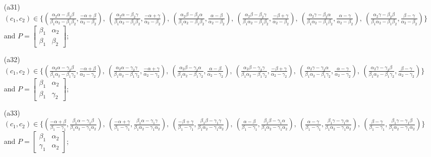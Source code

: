 \begin{enumerate}
\item[(a31)] $(c_1,c_2)\in \{(\frac{\alpha_2 \alpha  - \beta_2 \beta }{\beta_1 \alpha_2 - \beta_1 \beta_2},\frac{-\alpha  + \beta }{\alpha_2 - \beta_2}),\allowbreak\ (\frac{\alpha_2 \alpha  - \beta_2 \gamma }{\beta_1 \alpha_2 - \beta_1 \beta_2},\frac{-\alpha  + \gamma }{\alpha_2 - \beta_2}),\allowbreak\ (\frac{\alpha_2 \beta  - \beta_2 \alpha }{\beta_1 \alpha_2 - \beta_1 \beta_2},\frac{\alpha  - \beta }{\alpha_2 - \beta_2}),\allowbreak\ (\frac{\alpha_2 \beta  - \beta_2 \gamma }{\beta_1 \alpha_2 - \beta_1 \beta_2},\frac{-\beta  + \gamma }{\alpha_2 - \beta_2}),\allowbreak\ (\frac{\alpha_2 \gamma  - \beta_2 \alpha }{\beta_1 \alpha_2 - \beta_1 \beta_2},\frac{\alpha  - \gamma }{\alpha_2 - \beta_2}),\allowbreak\ (\frac{\alpha_2 \gamma  - \beta_2 \beta }{\beta_1 \alpha_2 - \beta_1 \beta_2},\frac{\beta  - \gamma }{\alpha_2 - \beta_2})\}$ and $P=\begin{bmatrix}\beta_1&\alpha_2\\\beta_1&\beta_2\end{bmatrix}$;
\item[(a32)] $(c_1,c_2)\in \{(\frac{\alpha_2 \alpha  - \gamma_2 \beta }{\beta_1 \alpha_2 - \beta_1 \gamma_2},\frac{-\alpha  + \beta }{\alpha_2 - \gamma_2}),\allowbreak\ (\frac{\alpha_2 \alpha  - \gamma_2 \gamma }{\beta_1 \alpha_2 - \beta_1 \gamma_2},\frac{-\alpha  + \gamma }{\alpha_2 - \gamma_2}),\allowbreak\ (\frac{\alpha_2 \beta  - \gamma_2 \alpha }{\beta_1 \alpha_2 - \beta_1 \gamma_2},\frac{\alpha  - \beta }{\alpha_2 - \gamma_2}),\allowbreak\ (\frac{\alpha_2 \beta  - \gamma_2 \gamma }{\beta_1 \alpha_2 - \beta_1 \gamma_2},\frac{-\beta  + \gamma }{\alpha_2 - \gamma_2}),\allowbreak\ (\frac{\alpha_2 \gamma  - \gamma_2 \alpha }{\beta_1 \alpha_2 - \beta_1 \gamma_2},\frac{\alpha  - \gamma }{\alpha_2 - \gamma_2}),\allowbreak\ (\frac{\alpha_2 \gamma  - \gamma_2 \beta }{\beta_1 \alpha_2 - \beta_1 \gamma_2},\frac{\beta  - \gamma }{\alpha_2 - \gamma_2})\}$ and $P=\begin{bmatrix}\beta_1&\alpha_2\\\beta_1&\gamma_2\end{bmatrix}$;
\item[(a33)] $(c_1,c_2)\in \{(\frac{-\alpha  + \beta }{\beta_1 - \gamma_1},\frac{\beta_1 \alpha  - \gamma_1 \beta }{\beta_1 \alpha_2 - \gamma_1 \alpha_2}),\allowbreak\ (\frac{-\alpha  + \gamma }{\beta_1 - \gamma_1},\frac{\beta_1 \alpha  - \gamma_1 \gamma }{\beta_1 \alpha_2 - \gamma_1 \alpha_2}),\allowbreak\ (\frac{-\beta  + \gamma }{\beta_1 - \gamma_1},\frac{\beta_1 \beta  - \gamma_1 \gamma }{\beta_1 \alpha_2 - \gamma_1 \alpha_2}),\allowbreak\ (\frac{\alpha  - \beta }{\beta_1 - \gamma_1},\frac{\beta_1 \beta  - \gamma_1 \alpha }{\beta_1 \alpha_2 - \gamma_1 \alpha_2}),\allowbreak\ (\frac{\alpha  - \gamma }{\beta_1 - \gamma_1},\frac{\beta_1 \gamma  - \gamma_1 \alpha }{\beta_1 \alpha_2 - \gamma_1 \alpha_2}),\allowbreak\ (\frac{\beta  - \gamma }{\beta_1 - \gamma_1},\frac{\beta_1 \gamma  - \gamma_1 \beta }{\beta_1 \alpha_2 - \gamma_1 \alpha_2})\}$ and $P=\begin{bmatrix}\beta_1&\alpha_2\\\gamma_1&\alpha_2\end{bmatrix}$;

\end{enumerate}
